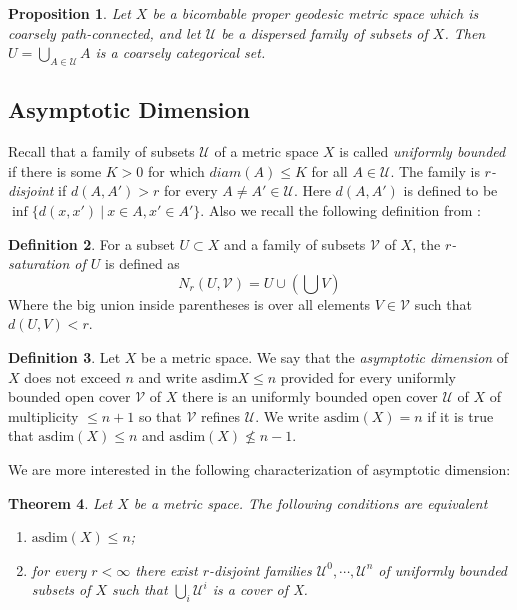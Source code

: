 \documentclass {amsart}
\newcommand {\asdim}    {\text{asdim}}
\newcommand {\U}        {\mathcal{U}}
\newcommand {\V}        {\mathcal{V}}
\newtheorem   {theorem}               {Theorem}       [section]
\newtheorem   {proposition} [theorem] {Proposition}
\theoremstyle {definition}
\newtheorem   {definition}  [theorem] {Definition}
\begin{document}
\begin{proposition}
    Let \( X \) be a bicombable proper geodesic metric space which is coarsely
    path-connected, and let \( \U \) be a dispersed family of subsets of 
    \( X \). Then \( U = \bigcup _{A \in \U} A \) is a coarsely categorical set.
\end{proposition}

\subsection {Asymptotic Dimension} 

Recall that a family of subsets \( \U \) of a metric space \( X \) is called
\emph{uniformly bounded} if there is some \( K > 0 \) for which \( diam(A) \leq
K\) for all \( A \in \U \). The family is \emph { \( r \)-disjoint } if \( d(A,
A') > r \) for every \( A \neq A' \in \U \). Here \( d(A,A') \) is defined to be
\( \inf \{ d(x, x') \ | \ x \in A, x' \in A' \} \). Also we recall the following
definition from \cite{bellAsymptoticDimensionBedlewo2005}:
\begin{definition}
    For a subset \( U \subset X \) and a family of subsets \( \V \) of \( X \),
    the \emph{\( r \)-saturation of \( U \)} is defined as
    \[
        N_r (U, \V) = U \cup \left( \bigcup V \right)
    \]
    Where the big union inside parentheses is over all elements \( V \in \V \)
    such that \( d(U,V) < r \).
\end{definition}


\begin{definition}
    \cite{gromovAsymptoticInvariantsInfinite1993}
  Let \( X \) be a metric space. We say that the \emph{asymptotic dimension} of
  \( X \) does not exceed \( n \) and write \( \asdim X \leq n \) provided for
  every uniformly bounded open cover \( \V \) of \( X \) there is an uniformly
  bounded open cover \( \U \) of \( X \) of multiplicity \( \leq n + 1 \) so
  that \( \V \) refines \( \U \). We write \( \asdim(X) = n \) if it is true
  that \( \asdim (X) \leq n \) and \( \asdim (X) \not \leq n-1 \).
\end{definition}

We are more interested in the following characterization of asymptotic
dimension:

\begin{theorem}
  \label{thm:asdim}
    Let \( X \) be a metric space. The following conditions are equivalent
    \begin{enumerate}
        \item \( \asdim(X) \leq n \);
        \item for every \( r < \infty \) there exist \( r \)-disjoint families \( \U^0,
              \cdots, \U^n \) of uniformly bounded subsets of \( X \) such that \( \bigcup _i
              \U^i \) is a cover of X.
    \end{enumerate}
\end{theorem}
\end{document}

